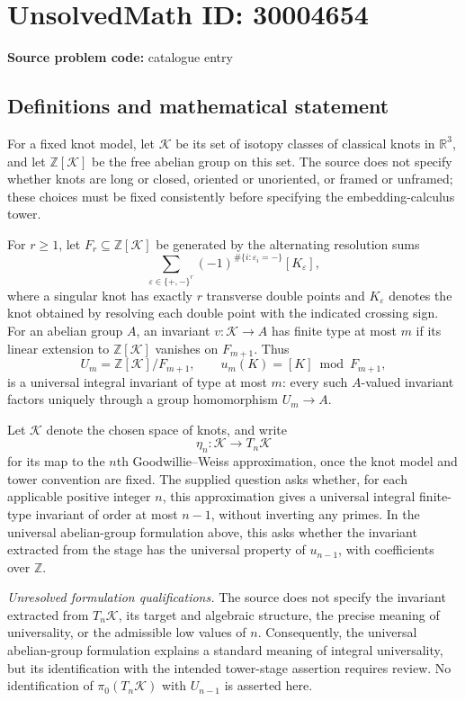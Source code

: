 \documentclass[11pt]{article}
\newcommand{\Z}{\mathbb{Z}}
\newcommand{\R}{\mathbb{R}}
\begin{document}
\section*{UnsolvedMath ID: 30004654}
\textbf{Source problem code:} catalogue entry
\subsection{Definitions and mathematical statement}
For a fixed knot model, let \(\mathcal K\) be its set of isotopy classes of classical knots in \(\R^3\), and let \(\Z[\mathcal K]\) be the free abelian group on this set. The source does not specify whether knots are long or closed, oriented or unoriented, or framed or unframed; these choices must be fixed consistently before specifying the embedding-calculus tower.

For \(r\geq 1\), let \(F_r\subseteq\Z[\mathcal K]\) be generated by the alternating resolution sums
\[
\sum_{\varepsilon\in\{+,-\}^{r}}(-1)^{\#\{i:\varepsilon_i=-\}}[K_{\varepsilon}],
\]
where a singular knot has exactly \(r\) transverse double points and \(K_{\varepsilon}\) denotes the knot obtained by resolving each double point with the indicated crossing sign. For an abelian group \(A\), an invariant \(v:\mathcal K\to A\) has finite type at most \(m\) if its linear extension to \(\Z[\mathcal K]\) vanishes on \(F_{m+1}\). Thus
\[
U_m=\Z[\mathcal K]/F_{m+1},\qquad u_m(K)=[K]\bmod F_{m+1},
\]
is a universal integral invariant of type at most \(m\): every such \(A\)-valued invariant factors uniquely through a group homomorphism \(U_m\to A\).

Let \(\mathscr K\) denote the chosen space of knots, and write
\[
\eta_n:\mathscr K\longrightarrow T_n\mathscr K
\]
for its map to the \(n\)th Goodwillie--Weiss approximation, once the knot model and tower convention are fixed. The supplied question asks whether, for each applicable positive integer \(n\), this approximation gives a universal integral finite-type invariant of order at most \(n-1\), without inverting any primes. In the universal abelian-group formulation above, this asks whether the invariant extracted from the stage has the universal property of \(u_{n-1}\), with coefficients over \(\Z\).

\textit{Unresolved formulation qualifications.} The source does not specify the invariant extracted from \(T_n\mathscr K\), its target and algebraic structure, the precise meaning of universality, or the admissible low values of \(n\). Consequently, the universal abelian-group formulation explains a standard meaning of integral universality, but its identification with the intended tower-stage assertion requires review. No identification of \(\pi_0(T_n\mathscr K)\) with \(U_{n-1}\) is asserted here.
\end{document}

